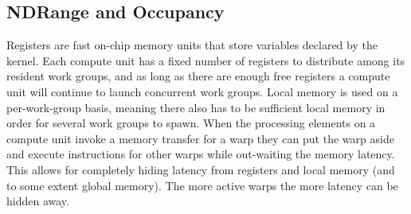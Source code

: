 \documentclass[11pt,twoside]{report}
\begin{document}










\subsection{NDRange and Occupancy\label{sec:NDRange}}

Registers are fast on-chip memory units that store variables declared by the kernel. Each compute unit has a fixed number of registers to distribute among its resident work groups, and as long as there are enough free registers a compute unit will continue to launch concurrent work groups. Local memory is used on a per-work-group basis, meaning there also has to be sufficient local memory in order for several work groups to spawn.
When the processing elements on a compute unit invoke a memory transfer for a warp they can put the warp aside and execute instructions for other warps while out-waiting the memory latency. This allows for completely hiding latency from registers and local memory (and to some extent global memory). The more active warps the more latency can be hidden away.
\end{document}
